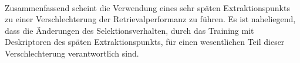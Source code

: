 \\
Zusammenfassend scheint die Verwendung eines sehr späten Extraktionspunkts zu einer Verschlechterung der Retrievalperformanz zu führen. Es ist naheliegend, dass die Änderungen des Selektionsverhalten, durch das Training mit Deskriptoren des späten Extraktionspunkts, für einen wesentlichen Teil dieser Verschlechterung verantwortlich sind.


 
